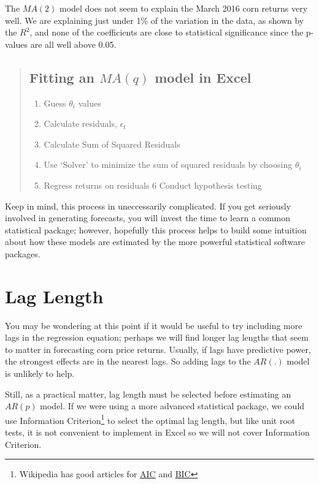 \documentclass[
  letterpaper,
  DIV=11,
  numbers=noendperiod]{scrreprt}
\providecommand{\tightlist}{%
  \setlength{\itemsep}{0pt}\setlength{\parskip}{0pt}}\usepackage{longtable,booktabs,array}
\begin{document}
The \(MA(2)\) model does not seem to explain the March 2016 corn returns
very well. We are explaining just under 1\% of the variation in the
data, as shown by the \(R^2\), and none of the coefficients are close to
statistical significance since the p-values are all well above 0.05.

\begin{quote}
\hypertarget{fitting-an-maq-model-in-excel}{%
\subsection{\texorpdfstring{Fitting an \(MA(q)\) model in
Excel}{Fitting an MA(q) model in Excel}}\label{fitting-an-maq-model-in-excel}}

\begin{enumerate}
\def\labelenumi{\arabic{enumi}.}
\tightlist
\item
  Guess \(\theta_i\) values
\item
  Calculate residuals, \(\epsilon_t\)
\item
  Calculate Sum of Squared Residuals
\item
  Use `Solver' to minimize the sum of squared residuals by choosing
  \(\theta_i\)
\item
  Regress returns on residuals 6 Conduct hypothesis testing
\end{enumerate}
\end{quote}

Keep in mind, this process in uneccessarily complicated. If you get
seriously involved in generating forecasts, you will invest the time to
learn a common statistical package; however, hopefully this process
helps to build some intuition about how these models are estimated by
the more powerful statistical software packages.

\hypertarget{lag-length}{%
\section{Lag Length}\label{lag-length}}

You may be wondering at this point if it would be useful to try
including more lags in the regression equation; perhaps we will find
longer lag lengths that seem to matter in forecasting corn price
returns. Usually, if lags have predictive power, the strongest effects
are in the nearest lags. So adding lags to the \(AR(.)\) model is
unlikely to help.

Still, as a practical matter, lag length must be selected before
estimating an \(AR(p)\) model. If we were using a more advanced
statistical package, we could use Information Criterion\footnote{Wikipedia
  has good articles for
  \href{https://en.wikipedia.org/wiki/Akaike_information_criterion}{AIC}
  and
  \href{https://en.wikipedia.org/wiki/Bayesian_information_criterion}{BIC}}
to select the optimal lag length, but like unit root tests, it is not
convenient to implement in Excel so we will not cover Information
Criterion.
\end{document}
